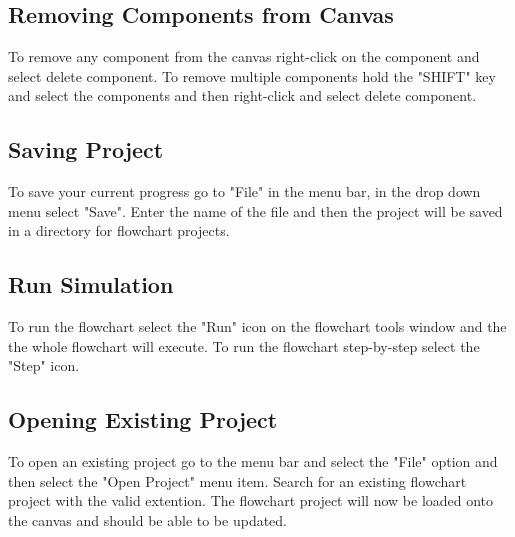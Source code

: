 \documentclass[11pt,a4paper,titlepage]{article}
\begin{document}
	\subsection{Removing Components from Canvas}
	
	To remove any component from the canvas right-click on the component and select delete component. To remove multiple components hold the "SHIFT" key and select the components and then right-click and select delete component.
		
	\subsection{Saving Project}
	
	To save your current progress go to "File" in the menu bar, in the drop down menu select "Save". Enter the name of the file and then the project will be saved in a directory for flowchart projects.
	
	\subsection{Run Simulation}
	To run the flowchart select the "Run" icon on the flowchart tools window and the the whole flowchart will execute. To run the flowchart step-by-step select the "Step" icon.
	
		
	\subsection{Opening Existing Project}
	
	To open an existing project go to the menu bar and select the "File" option and then select the "Open Project" menu item. Search for an existing flowchart project with the valid extention. The flowchart project will now be loaded onto the canvas and should be able to be updated.
	
		
\end{document}
